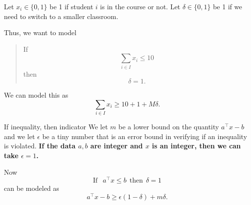 Let $x_i \in \{0,1\}$ be 1 if student $i$ is in the course or not.   Let $\delta \in \{0,1\}$ be 1 if we need to switch to a smaller classroom.  

Thus, we want to model 
\begin{quote}
If $$
\sum_{i \in I} x_i \leq 10
$$
then 
$$
\delta = 1.
$$
\end{quote}

We can model this as 
\begin{equation}
\sum_{i \in I} x_i \geq 10 + 1 + M\delta.
\end{equation}


\begin{general}{If inequality, then indicator}
We let $m$ be a lower bound on the quantity $a^\top x - b$ and we let $\epsilon$ be a tiny number that is an error bound in verifying if an inequality is violated.  \textbf{If the data $a,b$ are integer and $x$ is an integer, then we can take $\epsilon = 1$.}

Now
\begin{equation}
\text{If } \ \ a^\top x \leq b  \ \ \text{then}\ \ \delta = 1
\end{equation}
can be modeled as 
\begin{equation}
a^\top x -b  \geq  \epsilon(1-\delta) + m \delta.
\end{equation}
\end{general}



